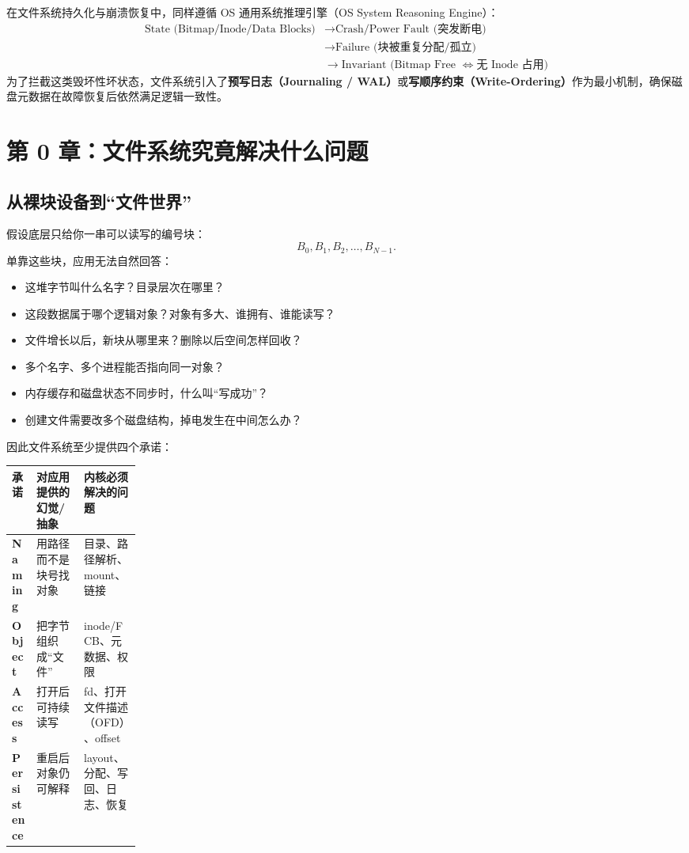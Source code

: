 \documentclass[11pt,a4paper]{ctexart}
\newcommand{\kw}[1]{\textbf{#1}}
\begin{document}
\begin{eng}
在文件系统持久化与崩溃恢复中，同样遵循 OS 通用系统推理引擎（OS System Reasoning Engine）：
\[
\begin{aligned}
\text{State (Bitmap/Inode/Data Blocks)} &\to \text{Crash/Power Fault (突发断电)} \\
&\to \text{Failure (块被重复分配/孤立)} \\
&\to \text{Invariant (Bitmap Free } \iff \text{无 Inode 占用)}
\end{aligned}
\]
为了拦截这类毁坏性坏状态，文件系统引入了\kw{预写日志（Journaling / WAL）}或\kw{写顺序约束（Write-Ordering）}作为最小机制，确保磁盘元数据在故障恢复后依然满足逻辑一致性。
\end{eng}

\tableofcontents
\newpage

\section{第 0 章：文件系统究竟解决什么问题}

\subsection{从裸块设备到“文件世界”}
假设底层只给你一串可以读写的编号块：
\[
B_0,B_1,B_2,\ldots,B_{N-1}.
\]
单靠这些块，应用无法自然回答：
\begin{itemize}
  \item 这堆字节叫什么名字？目录层次在哪里？
  \item 这段数据属于哪个逻辑对象？对象有多大、谁拥有、谁能读写？
  \item 文件增长以后，新块从哪里来？删除以后空间怎样回收？
  \item 多个名字、多个进程能否指向同一对象？
  \item 内存缓存和磁盘状态不同步时，什么叫“写成功”？
  \item 创建文件需要改多个磁盘结构，掉电发生在中间怎么办？
\end{itemize}

因此文件系统至少提供四个承诺：
\begin{center}
\small
\renewcommand{\arraystretch}{1.25}
\begin{tabularx}{\linewidth}{>{\bfseries}p{0.19\linewidth} X X}
\toprule
承诺 & 对应用提供的幻觉/抽象 & 内核必须解决的问题 \\
\midrule
Naming & 用路径而不是块号找对象 & 目录、路径解析、mount、链接 \\
Object & 把字节组织成“文件” & inode/FCB、元数据、权限 \\
Access & 打开后可持续读写 & fd、打开文件描述（OFD）、offset \\
Persistence & 重启后对象仍可解释 & layout、分配、写回、日志、恢复 \\
\bottomrule
\end{tabularx}
\end{center}
\end{document}
